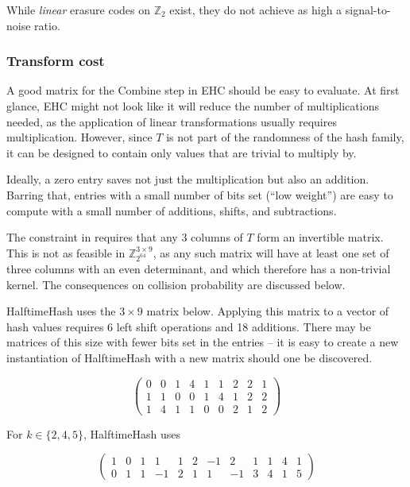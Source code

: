 \documentclass[sigconf, nonacm]{acmart}
\newcommand{\ints}{\mathbb{Z}}
\begin{document}
While {\em linear} erasure codes on $\ints_2$ exist, they do not achieve as high a signal-to-noise ratio. \cite{codetables.de}

\subsubsection{Transform cost}

A good matrix for the Combine step in EHC should be easy to evaluate.
At first glance, EHC might not look like it will reduce the number of multiplications needed, as the application of linear transformations usually requires multiplication.
However, since $T$ is not part of the randomness of the hash family, it can be designed to contain only values that are trivial to multiply by.

Ideally, a zero entry saves not just the multiplication but also an addition.
Barring that, entries with a small number of bits set (``low weight'') are easy to compute with a small number of additions, shifts, and subtractions.

The constraint in \cite{ehc-nandi} requires that any 3 columns of $T$ form an invertible matrix.
This is not as feasible in $\ints_{2^{64}}^{3 \times 9}$, as any such matrix will have at least one set of three columns with an even determinant, and which therefore has a non-trivial kernel.
The consequences on collision probability are discussed below.

HalftimeHash uses the $3 \times 9$ matrix below.
Applying this matrix to a vector of hash values requires 6 left shift operations and 18 additions.
There may be matrices of this size with fewer bits set in the entries -- it is easy to create a new instantiation of HalftimeHash with a new matrix should one be discovered.

\begin{displaymath}
  \left(
\begin{array}{rrrrrrrrr}
  0 & 0 & 1 & 4 & 1 & 1 & 2 & 2 & 1\\
  1 & 1 & 0 & 0 & 1 & 4 & 1 & 2 & 2\\
  1 & 4 & 1 & 1 & 0 & 0 & 2 & 1 & 2
\end{array}
\right)
\end{displaymath}

For $k \in \{2, 4, 5\}$, HalftimeHash uses

\[
\left(
\begin{array}{rrrrrrrrrrrr}
  1 & 0 & 1 & 1 & 1 & 2 & -1 & 2 & 1 & 1 & 4 & 1\\
  0 & 1 & 1 & -1 & 2 & 1 & 1 & -1 & 3 & 4 & 1 & 5
\end{array}
\right)
\]
\end{document}
